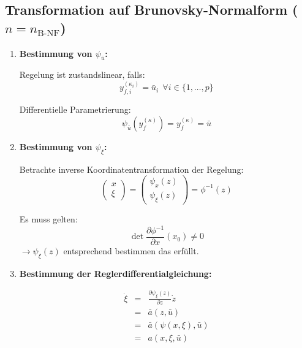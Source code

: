 \subsection{Transformation auf Brunovsky-Normalform ($n = n_\text{B-NF}$)}
\begin{enumerate}
    \item
        \textbf{Bestimmung von $\psi_{\bar{u}}$:}

        Regelung ist zustandslinear, falls:
        \begin{equation}
            y_{f,i}^{(\kappa_i)} = \bar{u}_i\ \ \forall i \in \{1, \ldots, p\}
        \end{equation}

        Differentielle Parametrierung:
        \begin{equation}
            \psi_{\bar{u}}(y_f^{(\kappa)}) = y_f^{(\kappa)} = \bar{u} 
        \end{equation}
    \item
        \textbf{Bestimmung von $\psi_\xi$:}

        Betrachte inverse Koordinatentransformation der Regelung:
        \begin{equation}
            \begin{pmatrix} x \\ \xi \end{pmatrix} =
            \begin{pmatrix} \psi_x(z) \\ \psi_\xi(z) \end{pmatrix} =
            \phi^{-1}(z)        
        \end{equation}

        Es muss gelten:
        \begin{equation}
            \det \frac{\partial \phi^{-1}}{\partial x}(x_0) \neq 0
        \end{equation}
        $\rightarrow \psi_\xi(z)$ entsprechend bestimmen das erfüllt.
    \item
        \textbf{Bestimmung der Reglerdifferentialgleichung:}

        \begin{eqnarray}
            \dot{\xi} &=& \frac{\partial \psi_\xi(z)}{\partial z} \dot{z} \\
                &=& \bar{a}(z, \bar{u}) \\
                &=& \bar{a}(\psi(x, \xi), \bar{u}) \\
                &=& a(x, \xi, \bar{u})
        \end{eqnarray}
        

\end{enumerate}
